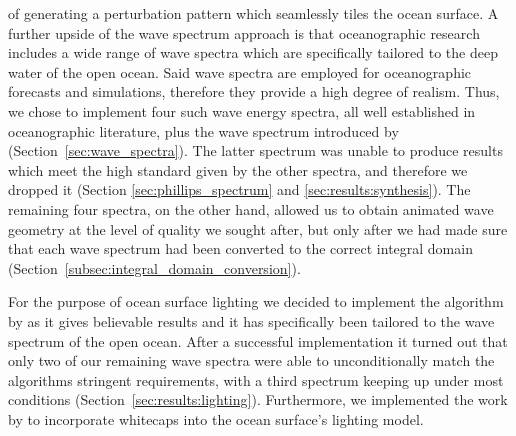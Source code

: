 of generating a perturbation pattern which seamlessly tiles the ocean surface.
A further upside of the wave spectrum approach is that oceanographic
research includes a wide range of wave spectra which are specifically
tailored to the deep water of the open ocean. Said wave spectra are
employed for oceanographic forecasts and simulations, therefore they
provide a high degree of realism.
Thus, we chose to implement four such wave energy spectra,
all well established in oceanographic literature, plus the wave
spectrum introduced by \citeauthor{course:simulatingocean} (Section~\ref{sec:wave_spectra}).
The latter spectrum was unable to produce results which meet the high
standard given by the other spectra, and therefore we dropped it
(Section \ref{sec:phillips_spectrum} and \ref{sec:results:synthesis}).
The remaining four spectra, on the other hand, allowed us to obtain
animated wave geometry at the level of quality we sought after,
but only after we had made sure that each wave spectrum had been converted
to the correct integral domain (Section~\ref{subsec:integral_domain_conversion}).
%

For the purpose of ocean surface lighting we decided to implement the
algorithm by \citet{misc:oceanlightingfft} as it gives believable results
and it has specifically been tailored to the wave spectrum of the open ocean.
After a successful implementation it turned out that only two of our
remaining wave spectra were able to unconditionally match the algorithms
stringent requirements, with a third spectrum keeping up under most
conditions (Section~\ref{sec:results:lighting}).
Furthermore, we implemented the work by \citet{article:whitecaps} to
incorporate whitecaps into the ocean surface's lighting model.



